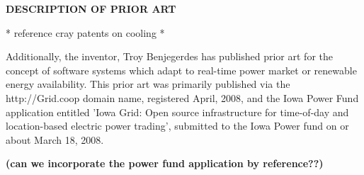 \documentclass[times]{article}
\begin{document}
\begin{center}
{\bf DESCRIPTION OF PRIOR ART}
\end{center}

 * reference cray patents on cooling *

Additionally, the inventor, Troy Benjegerdes has published prior art
for the concept of software systems which adapt to real-time power market
or renewable energy availability. This prior art was primarily published
via the http://Grid.coop domain name, registered April, 2008, and the
Iowa Power Fund application entitled 'Iowa Grid: Open source infrastructure
for time-of-day and location-based electric power trading', submitted
to the Iowa Power fund on or about March 18, 2008.

{\bf(can we incorporate the power fund application by reference??)}





%





%



%


%
%
\end{document}
